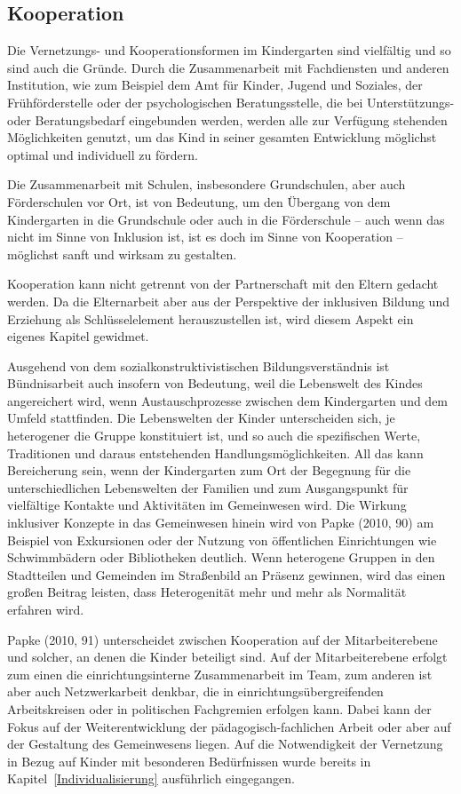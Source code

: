 \subsection{Kooperation}
\label{Kooperation}
Die Vernetzungs- und Kooperationsformen im Kindergarten sind vielfältig und so sind auch die Gründe. 
Durch die Zusammenarbeit mit Fachdiensten und anderen Institution, wie zum Beispiel dem Amt für Kinder, Jugend und Soziales, der Frühförderstelle oder der psychologischen Beratungsstelle, die bei Unterstützungs- oder Beratungsbedarf eingebunden werden, werden alle zur Verfügung stehenden Möglichkeiten genutzt, um das Kind in seiner gesamten Entwicklung möglichst optimal und individuell zu fördern.

Die Zusammenarbeit mit Schulen, insbesondere Grundschulen, aber auch Förderschulen vor Ort, ist von Bedeutung, um den Übergang von dem Kindergarten in die Grundschule oder auch in die Förderschule -- auch wenn das nicht im Sinne von Inklusion ist, ist es doch im Sinne von Kooperation -- möglichst sanft und wirksam zu gestalten. 

Kooperation kann nicht getrennt von der Partnerschaft mit den Eltern gedacht werden. Da die Elternarbeit aber aus der Perspektive der inklusiven Bildung und Erziehung als Schlüsselelement herauszustellen ist, wird diesem Aspekt ein eigenes Kapitel gewidmet. 

Ausgehend von dem sozialkonstruktivistischen Bildungsverständnis ist Bündnisarbeit auch insofern von Bedeutung, weil die Lebenswelt des Kindes angereichert wird, wenn Austauschprozesse zwischen dem Kindergarten und dem Umfeld stattfinden. Die Lebenswelten der Kinder unterscheiden sich, je heterogener die Gruppe konstituiert ist, und so auch die spezifischen Werte, Traditionen und daraus entstehenden Handlungsmöglichkeiten. All das kann Bereicherung sein, wenn der Kindergarten zum Ort der Begegnung für die unterschiedlichen Lebenswelten der Familien und zum Ausgangspunkt für vielfältige Kontakte und Aktivitäten im Gemeinwesen wird.  
Die Wirkung inklusiver Konzepte in das Gemeinwesen hinein wird von Papke (2010, 90) am Beispiel von Exkursionen oder der Nutzung von öffentlichen Einrichtungen wie Schwimmbädern oder Bibliotheken deutlich. Wenn heterogene Gruppen in den Stadtteilen und Gemeinden im Straßenbild an Präsenz gewinnen, wird das einen großen Beitrag leisten, dass Heterogenität mehr und mehr als Normalität erfahren wird.   
 
Papke (2010, 91) unterscheidet zwischen Kooperation auf der Mitarbeiterebene und solcher, an denen die Kinder beteiligt sind. Auf der Mitarbeiterebene erfolgt zum einen die einrichtungsinterne Zusammenarbeit im Team, zum anderen ist aber auch Netzwerkarbeit denkbar, die in einrichtungsübergreifenden Arbeitskreisen oder in politischen Fachgremien erfolgen kann. Dabei kann der Fokus auf der Weiterentwicklung der pädagogisch-fachlichen Arbeit oder aber auf der Gestaltung des Gemeinwesens liegen.
Auf die Notwendigkeit der Vernetzung in Bezug auf Kinder mit besonderen Bedürfnissen wurde bereits in Kapitel~\ref{Individualisierung} ausführlich eingegangen.     

